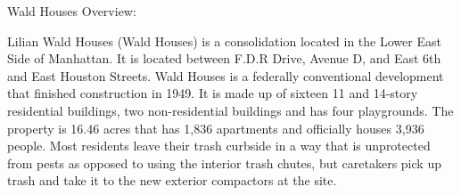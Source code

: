 Wald Houses Overview: 



Lilian Wald  Houses (Wald Houses) is a consolidation located in the Lower East Side of Manhattan. It is located between F.D.R Drive, Avenue D, and East 6th and East Houston Streets. Wald Houses is a federally conventional development that finished construction in 1949. It is made up of sixteen 11 and 14-story residential buildings, two non-residential buildings and has four playgrounds. The property is 16.46 acres that has 1,836 apartments and officially houses 3,936 people. Most residents leave their trash curbside in a way that is unprotected from pests as opposed to using the interior trash chutes, but caretakers pick up trash and take it to the new exterior compactors at the site.